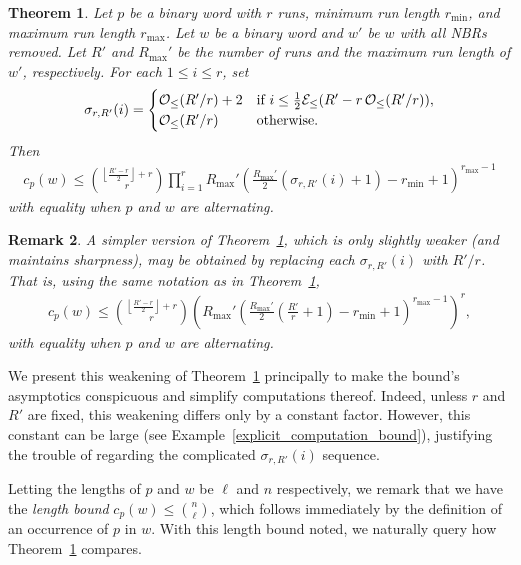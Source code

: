 \documentclass[11pt]{amsart}
\newtheorem{theorem}{Theorem}[section]
\newtheorem{remark}[theorem]{Remark}
\DeclareMathOperator{\oddleq}{\mathcal{O}_{\leq}}
\DeclareMathOperator{\evenleq}{\mathcal{E}_{\leq}}
\begin{document}
\begin{theorem}\label{upper_bound_thm}
    Let $p$ be a binary word with $r$ runs, minimum run length $r_{\min}$, and maximum run length $r_{\max}$. Let $w$ be a binary word and $w'$ be $w$ with all NBRs removed. Let $R'$ and $R_{\max}'$ be the number of runs and the maximum run length of $w'$, respectively. For each $1\leq i\leq r$, set
    \begin{align*}
        \sigma_{r,R'}(i)=
        \begin{cases}
            \oddleq\mleft(R'/r\mright)+2 & \text{\normalfont if~}i\leq \frac{1}{2}{\evenleq\mleft(R'-r\oddleq\mleft(R'/r\mright)\mright),}\\
            \oddleq\mleft(R'/r\mright) & \text{\normalfont otherwise.}
        \end{cases}
    \end{align*}
    Then
    \begin{align*}
        c_p(w)\leq{\left\lfloor\frac{R'-r}{2}\right\rfloor+r\choose r}\prod_{i=1}^{r}R_{\max}'\left(\frac{R_{\max}'}{2}\left(\sigma_{r,R'}(i)+1\right)-r_{\min}+1\right)^{r_{\max}-1}
    \end{align*}
    with equality when $p$ and $w$ are alternating.
\end{theorem}

\begin{remark}\label{relaxed_upper_bound}
    A simpler version of Theorem~\ref{upper_bound_thm}, which is only slightly weaker (and maintains sharpness), may be obtained by replacing each $\sigma_{r,R'}(i)$ with $R'/r$. That is, using the same notation as in Theorem~\ref{upper_bound_thm},
    \begin{align*}
        c_p(w)\leq{\left\lfloor\frac{R'-r}{2}\right\rfloor+r\choose r}\left(R_{\max}'\left(\frac{R_{\max}'}{2}\left(\frac{R'}{r}+1\right)-r_{\min}+1\right)^{r_{\max}-1}\right)^r,
    \end{align*}
    with equality when $p$ and $w$ are alternating.
\end{remark}

We present this weakening of Theorem~\ref{upper_bound_thm} principally to make the bound's asymptotics conspicuous and simplify computations thereof. Indeed, unless $r$ and $R'$ are fixed, this weakening differs only by a constant factor. However, this constant can be large (see Example~\ref{explicit_computation_bound}), justifying the trouble of regarding the complicated $\sigma_{r,R'}(i)$ sequence.

Letting the lengths of $p$ and $w$ be $\ell$ and $n$ respectively, we remark that we have the \emph{length bound} $c_p(w)\leq{n\choose\ell}$, which follows immediately by the definition of an occurrence of $p$ in $w$. With this length bound noted, we naturally query how Theorem~\ref{upper_bound_thm} compares.
\end{document}
